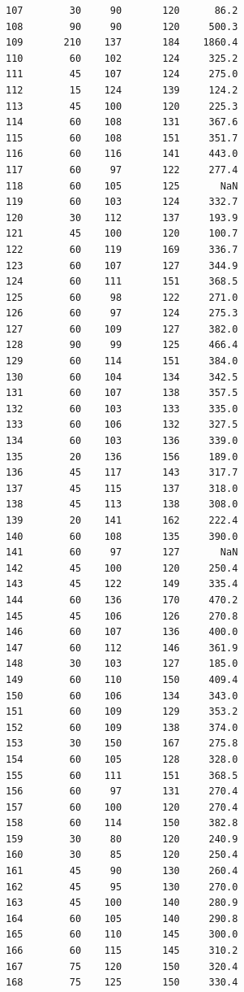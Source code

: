\begin{code}
\begin{verbatim}
107        30     90       120      86.2
108        90     90       120     500.3
109       210    137       184    1860.4
110        60    102       124     325.2
111        45    107       124     275.0
112        15    124       139     124.2
113        45    100       120     225.3
114        60    108       131     367.6
115        60    108       151     351.7
116        60    116       141     443.0
117        60     97       122     277.4
118        60    105       125       NaN
119        60    103       124     332.7
120        30    112       137     193.9
121        45    100       120     100.7
122        60    119       169     336.7
123        60    107       127     344.9
124        60    111       151     368.5
125        60     98       122     271.0
126        60     97       124     275.3
127        60    109       127     382.0
128        90     99       125     466.4
129        60    114       151     384.0
130        60    104       134     342.5
131        60    107       138     357.5
132        60    103       133     335.0
133        60    106       132     327.5
134        60    103       136     339.0
135        20    136       156     189.0
136        45    117       143     317.7
137        45    115       137     318.0
138        45    113       138     308.0
139        20    141       162     222.4
140        60    108       135     390.0
141        60     97       127       NaN
142        45    100       120     250.4
143        45    122       149     335.4
144        60    136       170     470.2
145        45    106       126     270.8
146        60    107       136     400.0
147        60    112       146     361.9
148        30    103       127     185.0
149        60    110       150     409.4
150        60    106       134     343.0
151        60    109       129     353.2
152        60    109       138     374.0
153        30    150       167     275.8
154        60    105       128     328.0
155        60    111       151     368.5
156        60     97       131     270.4
157        60    100       120     270.4
158        60    114       150     382.8
159        30     80       120     240.9
160        30     85       120     250.4
161        45     90       130     260.4
162        45     95       130     270.0
163        45    100       140     280.9
164        60    105       140     290.8
165        60    110       145     300.0
166        60    115       145     310.2
167        75    120       150     320.4
168        75    125       150     330.4

\end{verbatim}
\end{code}

